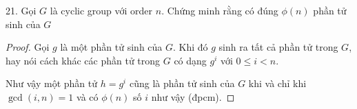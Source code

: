 21. Gọi $G$ là cyclic group với order $n$. Chứng minh rằng có đúng $\phi(n)$ phần tử sinh của $G$

\begin{proof}
    Gọi $g$ là một phần tử sinh của $G$. Khi đó $g$ sinh ra tất cả phần tử trong $G$, hay nói cách khác các phần tử trong $G$ có dạng $g^i$ với $0 \leq i < n$.

    Như vậy một phần tử $h = g^i$ cũng là phần tử sinh của $G$ khi và chỉ khi $\gcd(i, n) = 1$ và có $\phi(n)$ số $i$ như vậy (đpcm).

\end{proof}